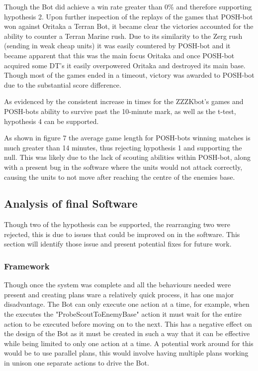\documentclass[journal]{IEEEtran}
\begin{document}
	Though the Bot did achieve a win rate greater than 0\% and therefore supporting hypothesis 2. Upon further inspection of the replays of the games that POSH-bot won against Oritaka a Terran Bot, it became clear the victories accounted for the ability to counter a Terran Marine rush. Due to its similarity to the Zerg rush (sending in weak cheap units) it was easily countered by POSH-bot and it became apparent that this was the main focus Oritaka and once POSH-bot acquired some DT's it easily overpowered Oritaka and destroyed its main base. Though most of the games ended in a timeout, victory was awarded to POSH-bot due to the substantial score difference.
	
	As evidenced by the consistent increase in times for the ZZZKbot's games and POSH-bots ability to survive past the 10-minute mark, as well as the t-test, hypothesis 4 can be supported. 
	
	As shown in figure 7 the average game length for POSH-bots winning matches is much greater than 14 minutes, thus rejecting hypothesis 1 and supporting the null. This was likely due to the lack of scouting abilities within POSH-bot, along with a present bug in the software where the units would not attack correctly, causing the units to not move after reaching the centre of the enemies base. 
	
	\subsection{Analysis of final Software}
	Though two of the hypothesis can be supported, the rearranging two were rejected, this is due to issues that could be improved on in the software. This section will identify those issue and present potential fixes for future work.
	\newline
	
	\subsubsection{Framework}	
	Though once the system was complete and all the behaviours needed were present and creating plans ware a relatively quick process, it has one major disadvantage. The Bot can only execute one action at a time, for example, when the executes the "ProbeScoutToEnemyBase" action it must wait for the entire action to be executed before moving on to the next. This has a negative effect on the design of the Bot as it must be created in such a way that it can be effective while being limited to only one action at a time. A potential work around for this would be to use parallel plans, this would involve having multiple plans working in unison one separate actions to drive the Bot.	
	
\end{document}
